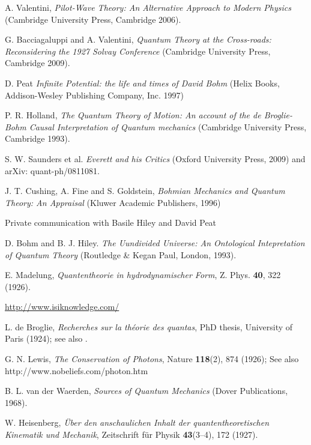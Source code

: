 \documentclass[nofootinbib, secnumarabic, amsmath, nobibnotes,11pt,aps,pra, floatfix]{revtex4-1}
\begin{document}
\begin{thebibliography}{999}
A. Valentini, \emph{Pilot-Wave Theory: An Alternative Approach to Modern Physics} (Cambridge University Press, Cambridge 2006).

G. Bacciagaluppi and A. Valentini, \emph{Quantum Theory at the Cross-roads: Reconsidering the 1927 Solvay Conference} (Cambridge University Press, Cambridge 2009).

D. Peat \emph{Infinite Potential: the life and times of David Bohm} (Helix Books, Addison-Wesley Publishing Company, Inc. 1997)

P. R. Holland, \emph{The Quantum Theory of Motion: An account of the de Broglie-Bohm Causal Interpretation of Quantum mechanics}  (Cambridge University Press, Cambridge 1993).

S. W. Saunders et al. \emph{Everett and his Critics} (Oxford University Press, 2009) and arXiv: quant-ph/0811081.

J. T. Cushing, A. Fine and S. Goldstein, \emph{Bohmian Mechanics and Quantum Theory: An Appraisal}  (Kluwer Academic Publishers, 1996)

Private communication with Basile Hiley and David Peat

D. Bohm and B. J. Hiley. \emph{The Uundivided Universe: An Ontological Intepretation of Quantum Theory} (Routledge \& Kegan Paul, London, 1993).

E. Madelung, \emph{Quantentheorie in hydrodynamischer Form}, Z. Phys. \textbf{40},  322 (1926).

\url{http://www.isiknowledge.com/}


L. de Broglie, \emph{Recherches sur la th\'{e}orie des quantas}, PhD
thesis, University of Paris (1924); see also \cite{om.dB_AnnPhys}.


G. N. Lewis, \emph{The Conservation of Photons}, Nature \textbf{118}(2),  874 (1926); See also http://www.nobeliefs.com/photon.htm

B. L. van der Waerden, \emph{Sources of Quantum Mechanics} (Dover Publications, 1968).

W. Heisenberg, \emph{\"{U}ber den anschaulichen Inhalt der quantentheoretischen Kinematik und Mechanik}, Zeitschrift f\"{u}r Physik \textbf{43}(3--4),  172 (1927).


\end{thebibliography}
\end{document}
